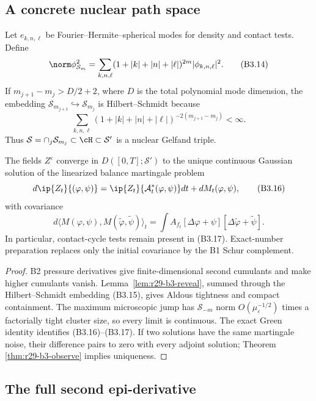 \subsection{A concrete nuclear path space}

Let $e_{k,n,\ell}$ be Fourier--Hermite--spherical modes for density and contact
tests.  Define
\[
 \norm\phi_{\mathcal S_m}^2
 =\sum_{k,n,\ell}(1+|k|+|n|+|\ell|)^{2m}
       |\phi_{k,n,\ell}|^2.                               \tag{B3.14}
\]
If $m_{j+1}-m_j>D/2+2$, where $D$ is the total polynomial mode dimension, the
embedding $\mathcal S_{m_{j+1}}\hookrightarrow\mathcal S_{m_j}$ is
Hilbert--Schmidt because
\[
 \sum_{k,n,\ell}(1+|k|+|n|+|\ell|)^{-2(m_{j+1}-m_j)}<\infty.             \tag{B3.15}
\]
Thus
$\mathcal S=\cap_j\mathcal S_{m_j}\subset\cH\subset\mathcal S'$ is a
nuclear Gelfand triple.

\begin{theorem}
\label{thm:r29-b3-clt}
The fields $Z^\varepsilon$ converge in
$D([0,T];\mathcal S')$ to the unique continuous Gaussian solution of the
linearized balance martingale problem
\[
 d\ip{Z_t}{(\varphi,\psi)}
 =\ip{Z_t}{\mathcal A_t^*(\varphi,\psi)}dt+dM_t(\varphi,\psi),           \tag{B3.16}
\]
with covariance
\[
 d\langle M(\varphi,\psi),M(\tilde\varphi,\tilde\psi)\rangle_t
 =\int A_{f_t}
 [\Delta\varphi+\psi][\Delta\tilde\varphi+\tilde\psi] .  \tag{B3.17}
\]
In particular, contact-cycle tests remain present in (B3.17).  Exact-number
preparation replaces only the initial covariance by the B1 Schur complement.
\end{theorem}

\begin{proof}
B2 pressure derivatives give finite-dimensional second cumulants and make
higher cumulants vanish.  Lemma~\ref{lem:r29-b3-reveal}, summed through the
Hilbert--Schmidt embedding (B3.15), gives Aldous tightness and compact
containment.  The maximum microscopic jump has
$\mathcal S_{-m}$ norm $O(\mu_\varepsilon^{-1/2})$ times a factorially tight
cluster size, so every limit is continuous.  The exact Green identity
identifies (B3.16)--(B3.17).  If two solutions have the same martingale noise,
their difference pairs to zero with every adjoint solution; Theorem
\ref{thm:r29-b3-observe} implies uniqueness.
\end{proof}

\subsection{The full second epi-derivative}

